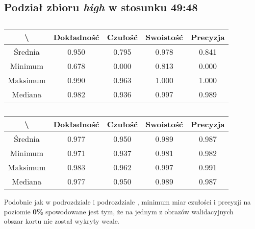 \subsection{Podział zbioru \textit{high} w stosunku 49:48}
\label{sec:highsplitd}


\begin{table}[H]
	\centering
	\caption{}
	\vspace{6pt}
	{\footnotesize
		\begin{tabular}{|c|c|c|c|c|}
      \hline \textbackslash & Dokładność & Czułość & Swoistość & Precyzja \\
      \hline Średnia & 0.950 & 0.795 & 0.978 & 0.841 \\
      \hline Minimum & 0.678 & 0.000 & 0.813 & 0.000 \\
      \hline Maksimum & 0.990 & 0.963 & 1.000 & 1.000 \\
      \hline Mediana & 0.982 & 0.936 & 0.997 & 0.989 \\
      \hline
    \end{tabular}
    \label{Tab:highsplitd_val}
	}
	\vspace{0pt}
\end{table}

\begin{table}[H]
	\centering
	\caption{}
	\vspace{6pt}
	{\footnotesize
		\begin{tabular}{|c|c|c|c|c|}
      \hline \textbackslash & Dokładność & Czułość & Swoistość & Precyzja \\
      \hline Średnia & 0.977 & 0.950 & 0.989 & 0.987 \\
      \hline Minimum & 0.971 & 0.937 & 0.981 & 0.982 \\
      \hline Maksimum & 0.983 & 0.962 & 0.997 & 0.991 \\
      \hline Mediana & 0.977 & 0.950 & 0.989 & 0.987 \\
      \hline
    \end{tabular}
    \label{Tab:highsplitd_test}
	}
	\vspace{0pt}
\end{table}

Podobnie jak w podrozdziale  i podrozdziale , minimum miar czułości i precyzji na poziomie \textbf{0\%} spowodowane jest tym, że na jednym z obrazów walidacyjnych obszar kortu nie został wykryty wcale.
